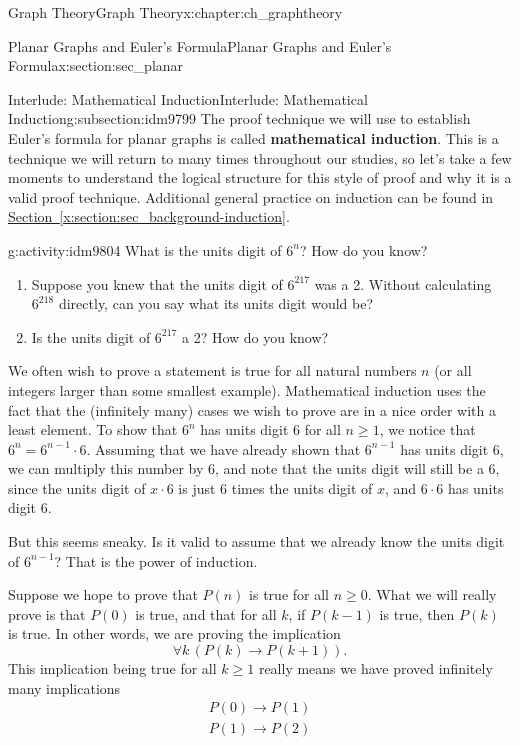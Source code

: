 \documentclass[oneside,10pt,]{book}
\newcommand{\terminology}[1]{\textbf{#1}}
\numberwithin{equation}{chapter}
\def\imp{\rightarrow}
\begin{document}
\begin{chapterptx}{Graph Theory}{}{Graph Theory}{}{}{x:chapter:ch_graphtheory}
\begin{sectionptx}{Planar Graphs and Euler's Formula}{}{Planar Graphs and Euler's Formula}{}{}{x:section:sec_planar}
\begin{subsectionptx}{Interlude: Mathematical Induction}{}{Interlude: Mathematical Induction}{}{}{g:subsection:idm9799}
The proof technique we will use to establish Euler's formula for planar graphs is called \terminology{mathematical induction}.  This is a technique we will return to many times throughout our studies, so let's take a few moments to understand the logical structure for this style of proof and why it is a valid proof technique.  Additional general practice on induction can be found in \hyperref[x:section:sec_background-induction]{Section~\ref{x:section:sec_background-induction}}.%
\begin{activity}{}{g:activity:idm9804}%
What is the units digit of \(6^n\)?  How do you know?%
\begin{enumerate}[font=\bfseries,label=(\alph*),ref=\alph*]
\item{}Suppose you knew that the units digit of \(6^{217}\) was a 2.  Without calculating \(6^{218}\) directly, can you say what its units digit would be?%
\item{}Is the units digit of \(6^{217}\) a 2?  How do you know?%
\end{enumerate}
\end{activity}
We often wish to prove a statement is true for all natural numbers \(n\) (or all integers larger than some smallest example).  Mathematical induction uses the fact that the (infinitely many) cases we wish to prove are in a nice order with a least element.  To show that \(6^n\) has units digit 6 for all \(n \ge 1\), we notice that \(6^n = 6^{n-1}\cdot 6\).  Assuming that we have already shown that \(6^{n-1}\) has units digit 6, we can multiply this number by 6, and note that the units digit will still be a 6, since the units digit of \(x \cdot 6\) is just 6 times the units digit of \(x\), and \(6\cdot 6\) has units digit 6.%
\par
But this seems sneaky.  Is it valid to assume that we already know the units digit of \(6^{n-1}\)?  That is the power of induction.%
\par
Suppose we hope to prove that \(P(n)\) is true for all \(n \ge 0\).  What we will really prove is that \(P(0)\) is true, and that for all \(k\), if \(P(k-1)\) is true, then \(P(k)\) is true.  In other words, we are proving the implication%
\begin{equation*}
\forall k \,(P(k) \imp P(k+1)).
\end{equation*}
This implication being true for all \(k \ge 1\) really means we have proved infinitely many implications%
\begin{gather*}
P(0) \imp P(1)\\
P(1) \imp P(2)\\

\end{gather*}
\end{subsectionptx}
\end{sectionptx}
\end{chapterptx}
\end{document}
